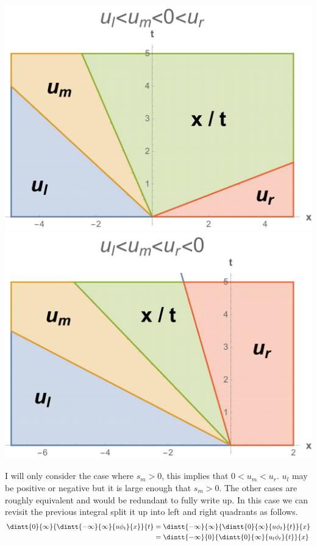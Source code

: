 \documentclass[11pt, oneside]{article}
\begin{document}
\begin{enumerate}
\begin{center}
      \includegraphics[scale=.30]{Figures/01_05.pdf}
      \includegraphics[scale=.30]{Figures/01_06.pdf}
    \end{center}
    I will only consider the case where $s_m > 0$, this implies that $0 < u_m < u_r$.
    $u_l$ may be positive or negative but it is large enough that $s_m > 0$.
    The other cases are roughly equivalent and would be redundant to fully write up.
    In this case we can revisit the previous integral split it up into left and
    right quadrants as follows.
    \begin{align*}
      \dintt{0}{\infty}{\dintt{-\infty}{\infty}{u \phi_t}{x}}{t} 
      &= \dintt{-\infty}{\infty}{\dintt{0}{\infty}{u \phi_t}{t}}{x} \\
      &= \dintt{-\infty}{0}{\dintt{0}{\infty}{u_l \phi_t}{t}}{x} 

\end{align*}
\end{enumerate}
\end{document}
